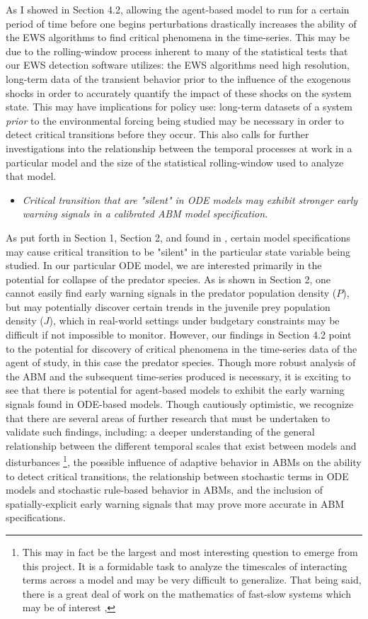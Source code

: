\documentclass[12pt]{article}
\begin{document}
As I showed in Section 4.2, allowing the agent-based model to run for a certain period of time before one begins perturbations drastically increases the ability of the EWS algorithms to find critical phenomena in the time-series. This may be due to the rolling-window process inherent to many of the statistical tests that our EWS detection software utilizes: the EWS algorithms need high resolution, long-term data of the transient behavior prior to the influence of the exogenous shocks in order to accurately quantify the impact of these shocks on the system state. This may have implications for policy use: long-term datasets of a system \emph{prior} to the environmental forcing being studied may be necessary in order to detect critical transitions before they occur. This also calls for further investigations into the relationship between the temporal processes at work in a particular model and the size of the statistical rolling-window used to analyze that model. 

\begin{itemize}
	\item \emph{Critical transition that are "silent" in ODE models may exhibit stronger early warning signals in a calibrated ABM model specification}.
\end{itemize}

As put forth in Section 1, Section 2, and found in \cite{Boerlijst2013}, certain model specifications may cause critical transition to be "silent" in the particular state variable being studied. In our particular ODE model, we are interested primarily in the potential for collapse of the predator species. As is shown in Section 2, one cannot easily find early warning signals in the predator population density ($P$), but may potentially discover certain trends in the juvenile prey population density ($J$), which in real-world settings under budgetary constraints may be difficult if not impossible to monitor. However, our findings in Section 4.2 point to the potential for discovery of critical phenomena in the time-series data of the agent of study, in this case the predator species. Though more robust analysis of the ABM and the subsequent time-series produced is necessary, it is exciting to see that there is potential for agent-based models to exhibit the early warning signals found in ODE-based models. Though cautiously optimistic, we recognize that there are several areas of further research that must be undertaken to validate such findings, including: a deeper understanding of the general relationship between the different temporal scales that exist between models and disturbances \footnote{This may in fact be the largest and most interesting question to emerge from this project. It is a formidable task to analyze the timescales of interacting terms across a model and may be very difficult to generalize. That being said, there is a great deal of work on the mathematics of fast-slow systems which may be of interest \cite{Kuehn2011},\cite{Kuehn2013}}, the possible influence of adaptive behavior in ABMs on the ability to detect critical transitions, the relationship between stochastic terms in ODE models and stochastic rule-based behavior in ABMs, and the inclusion of spatially-explicit early warning signals that may prove more accurate in ABM specifications.  
\end{document}
